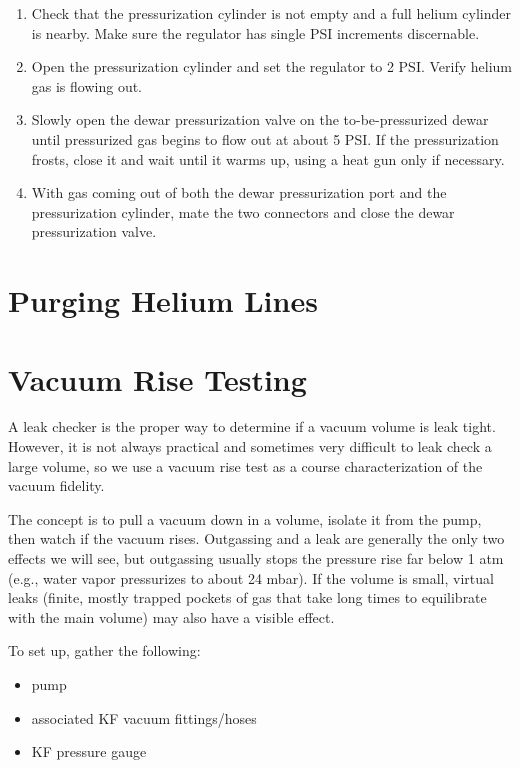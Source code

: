 \begin{enumerate}
 \item Check that the pressurization cylinder is not empty and a full helium cylinder is nearby.  Make sure the regulator has single PSI increments discernable.
 \item Open the pressurization cylinder and set the regulator to 2 PSI.  Verify helium gas is flowing out.
 \item Slowly open the dewar pressurization valve on the to-be-pressurized dewar until pressurized gas begins to flow out at about 5 PSI.  If the pressurization frosts, close it and wait until it warms up, using a heat gun only if  necessary.
 \item With gas coming out of both the dewar pressurization port and the pressurization cylinder, mate the two connectors and close the dewar pressurization valve.
\end{enumerate}


\section{Purging Helium Lines}

\section{Vacuum Rise Testing}

A leak checker is the proper way to determine if a vacuum volume is leak tight.  However, it is not always practical and sometimes very difficult to leak check a large volume, so we use a vacuum rise test as a course characterization of the vacuum fidelity.


The concept is to pull a vacuum down in a volume, isolate it from the pump, then watch if the vacuum rises.  Outgassing and a leak are generally the only two effects we will see, but outgassing usually stops the pressure rise far below 1 atm (e.g., water vapor pressurizes to about 24 mbar).  If the volume is small, virtual leaks (finite, mostly trapped pockets of gas that take long times to equilibrate with the main volume) may also have a visible effect.

To set up, gather the following:
\begin{itemize}
 \item pump 
 \item associated KF vacuum fittings/hoses
 \item KF pressure gauge
\end{itemize}


